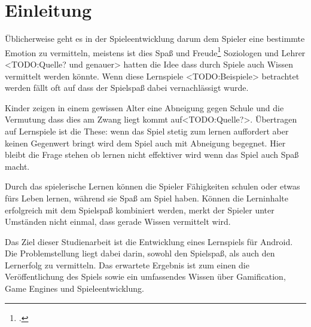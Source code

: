\section{Einleitung}
	Üblicherweise geht es in der Spieleentwicklung darum dem Spieler eine bestimmte Emotion zu vermitteln, meistens ist dies Spaß und Freude\footcite{persona} Soziologen und Lehrer <TODO:Quelle? und genauer> hatten die Idee dass durch Spiele auch Wissen vermittelt werden könnte. Wenn diese Lernspiele <TODO:Beispiele> betrachtet werden fällt oft auf dass der Spielspaß dabei vernachlässigt wurde.

	Kinder zeigen in einem gewissen Alter eine Abneigung gegen Schule und die Vermutung dass dies am Zwang liegt kommt auf<TODO:Quelle?>. Übertragen auf Lernspiele ist die These: wenn das Spiel stetig zum lernen auffordert aber keinen Gegenwert bringt wird dem Spiel auch mit Abneigung begegnet.
	Hier bleibt die Frage stehen ob lernen nicht effektiver wird wenn das Spiel auch Spaß macht.

	Durch das spielerische Lernen können die Spieler Fähigkeiten schulen oder etwas fürs Leben lernen, während sie Spaß am Spiel haben. Können die Lerninhalte erfolgreich mit dem Spielspaß kombiniert werden, merkt der Spieler unter Umständen nicht einmal, dass gerade Wissen vermittelt wird.

	Das Ziel dieser Studienarbeit ist die Entwicklung eines Lernspiels für Android. Die Problemstellung liegt dabei darin, sowohl den Spielspaß, als auch den Lernerfolg zu vermitteln. Das erwartete Ergebnis ist zum einen die Veröffentlichung des Spiels sowie ein umfassendes Wissen über Gamification, Game Engines und Spieleentwicklung.

